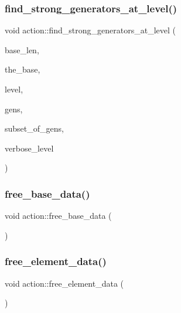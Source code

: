 \subsubsection{\texorpdfstring{find\+\_\+strong\+\_\+generators\+\_\+at\+\_\+level()}{find\_strong\_generators\_at\_level()}}
{\footnotesize\ttfamily void action\+::find\+\_\+strong\+\_\+generators\+\_\+at\+\_\+level (\begin{DoxyParamCaption}\item[{\mbox{\hyperlink{galois_8h_a09fddde158a3a20bd2dcadb609de11dc}{I\+NT}}}]{base\+\_\+len,  }\item[{\mbox{\hyperlink{galois_8h_a09fddde158a3a20bd2dcadb609de11dc}{I\+NT}} $\ast$}]{the\+\_\+base,  }\item[{\mbox{\hyperlink{galois_8h_a09fddde158a3a20bd2dcadb609de11dc}{I\+NT}}}]{level,  }\item[{\mbox{\hyperlink{classvector__ge}{vector\+\_\+ge}} \&}]{gens,  }\item[{\mbox{\hyperlink{classvector__ge}{vector\+\_\+ge}} \&}]{subset\+\_\+of\+\_\+gens,  }\item[{\mbox{\hyperlink{galois_8h_a09fddde158a3a20bd2dcadb609de11dc}{I\+NT}}}]{verbose\+\_\+level }\end{DoxyParamCaption})}

\mbox{\label{classaction_a27aa9e5940cc8e08da6727927d0798a8}} 
\subsubsection{\texorpdfstring{free\+\_\+base\+\_\+data()}{free\_base\_data()}}
{\footnotesize\ttfamily void action\+::free\+\_\+base\+\_\+data (\begin{DoxyParamCaption}{ }\end{DoxyParamCaption})}

\mbox{\label{classaction_a0525616f907783df74d020e0db13cca3}} 
\subsubsection{\texorpdfstring{free\+\_\+element\+\_\+data()}{free\_element\_data()}}
{\footnotesize\ttfamily void action\+::free\+\_\+element\+\_\+data (\begin{DoxyParamCaption}{ }\end{DoxyParamCaption})}

